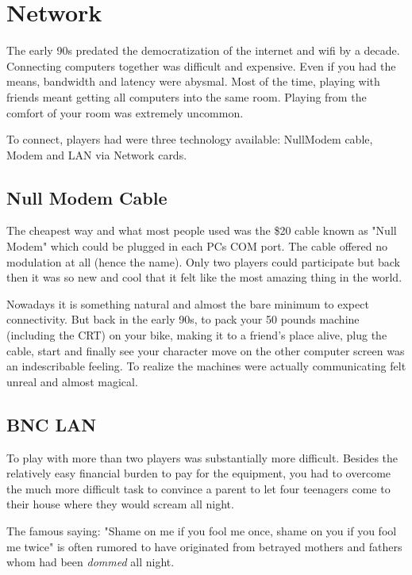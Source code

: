 \section{Network}
The early 90s predated the democratization of the internet and wifi by a decade. Connecting computers together was difficult and expensive. Even if you had the means, bandwidth and latency were abysmal. Most of the time, playing with friends meant getting all computers into the same room. Playing from the comfort of your room was extremely uncommon.\\
\par To connect, players had were three technology available: NullModem cable, Modem and LAN via Network cards.\\
\par









\subsection{Null Modem Cable}
The cheapest way and what most people used was the \$20 cable known as "Null Modem" which could be plugged in each PCs COM port. The cable offered no modulation at all (hence the name). Only two players could participate but back then it was so new and cool that it felt like the most amazing thing in the world.\\
\par
Nowadays it is something natural and almost the bare minimum to expect connectivity. But back in the early 90s, to pack your 50 pounds machine (including the CRT) on your bike, making it to a friend's place alive, plug the cable, start \doom and finally see your character move on the other computer screen was an indescribable feeling. To realize the machines were actually communicating felt unreal and almost magical.\\
\par 
{}








\subsection{BNC LAN}
To play with more than two players was substantially more difficult. Besides the relatively easy financial burden to pay for the equipment, you had to overcome the much more difficult task to convince a parent to let four teenagers come to their house where they would scream all night.\\
\par
The famous saying: "Shame on me if you fool me once, shame on you if you fool me twice" is often rumored to have originated from betrayed mothers and fathers whom had been \textit{dommed} all night.\\
\par


